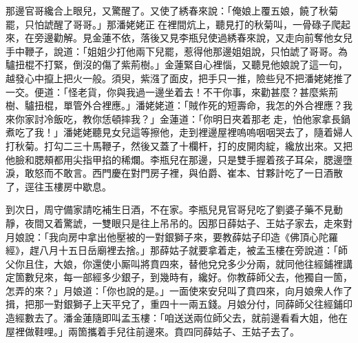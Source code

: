 那邊官哥纔合上眼兒，又驚醒了。{}又使了綉春來說：「俺娘上覆五娘，饒了秋菊罷，只怕諕醒了哥哥。」那潘姥姥正𢱉在裡間炕上，聽見打的秋菊叫，一骨碌子爬起來，在旁邊勸解。見金蓮不依，落後又見李瓶兒使過綉春來說，又走向前奪他女兒手中鞭子，說道：「姐姐少打他兩下兒罷，惹得他那邊姐姐說，只怕諕了哥哥。為驢扭棍不打緊，倒沒的傷了紫荊樹。」金蓮緊自心裡惱，又聽見他娘說了這一句，越發心中攛上把火一般。須臾，紫漒了面皮，把手只一推，險些兒不把潘姥姥推了一交。便道：「怪老貨，你與我過一邊坐着去！不干你事，來勸甚麼？甚麼紫荊樹、驢扭棍，單管外合裡應。」潘姥姥道：「賊作死的短壽命，{}我怎的外合裡應？我來你家討冷飯吃，教你恁頓摔我？」金蓮道：「你明日夾着那老𣭈走，怕他家拿長鍋煮吃了我！」{}潘姥姥聽見女兒這等擦他，走到裡邊屋裡嗚嗚咽咽哭去了，隨着婦人打秋菊。打勾二三十馬鞭子，然後又蓋了十欄杆，打的皮開肉綻，纔放出來。又把他臉和腮頰都用尖指甲掐的稀爛。{}李瓶兒在那邊，只是雙手握着孩子耳朵，腮邊墮淚，敢怒而不敢言。西門慶在對門房子裡，與伯爵、崔本、甘夥計吃了一日酒散了，逕往玉樓房中歇息。

到次日，周守備家請吃補生日酒，不在家。李瓶兒見官哥兒吃了劉婆子藥不見動靜，夜間又着驚諕，一雙眼只是往上吊吊的。因那日薛姑子、王姑子家去，走來對月娘說：「我向房中拿出他壓被的一對銀獅子來，要教薛姑子印造《佛頂心陀羅經》，趕八月十五日岳廟裡去捨。」那薛姑子就要拿着走，被孟玉樓在旁說道：「師父你且住，大娘，你還使小厮叫將賁四來，替他兌兌多少分兩，就同他往經鋪裡講定箇數兒來，每一部經多少銀子，到幾時有，纔好。你教薛師父去，他獨自一箇，怎弄的來？」{}月娘道：「你也說的是。」一面使來安兒叫了賁四來，向月娘衆人作了揖，把那一對銀獅子上天平兌了，重四十一兩五錢。月娘分付，同薛師父往經鋪印造經數去了。潘金蓮隨即叫孟玉樓：「咱送送兩位師父去，就前邊看看大姐，他在屋裡做鞋哩。」兩箇攜着手兒往前邊來。賁四同薛姑子、王姑子去了。

